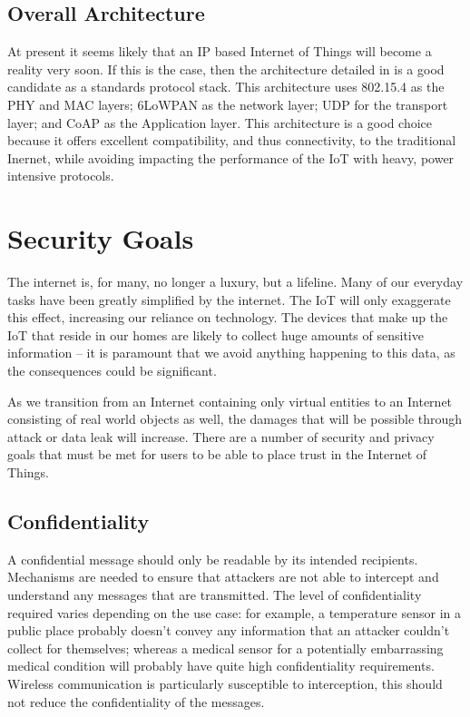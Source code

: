 \documentclass[11pt,journal,compsoc]{IEEEtran}
\begin{document}
\subsection{Overall Architecture}
At present it seems likely that an IP based Internet of Things will become a
reality very soon. If this is the case, then the architecture detailed in
\cite{Palattella2013} is a good candidate as a standards protocol stack. This
architecture uses 802.15.4 as the PHY and MAC layers; 6LoWPAN as the network
layer; UDP for the transport layer; and CoAP as the Application layer. This
architecture is a good choice because it offers excellent compatibility, and
thus connectivity, to the traditional Inernet, while avoiding impacting the
performance of the IoT with heavy, power intensive protocols. 

\section{Security Goals}
The internet is, for many, no longer a luxury, but a lifeline. Many of our
everyday tasks have been greatly simplified by the internet. The IoT will only
exaggerate this effect, increasing our reliance on technology. The devices that
make up the IoT that reside in our homes are likely to collect huge amounts of
sensitive information -- it is paramount that we avoid anything happening to
this data, as the consequences could be significant. 

As we transition from an Internet containing only virtual entities to an
Internet consisting of real world objects as well, the damages that will be
possible through attack or data leak will increase. There are a number of
security and privacy goals that must be met for users to be able to place trust
in the Internet of Things.

\subsection{Confidentiality}
A confidential message should only be readable by its intended recipients.
Mechanisms are needed to ensure that attackers are not able to intercept and
understand any messages that are transmitted. The level of confidentiality
required varies depending on the use case: for example, a temperature sensor in
a public place probably doesn't convey any information that an attacker
couldn't collect for themselves; whereas a medical sensor for a potentially
embarrassing medical condition will probably have quite high confidentiality
requirements. Wireless communication is particularly susceptible to
interception, this should not reduce the confidentiality of the messages.  
\end{document}
